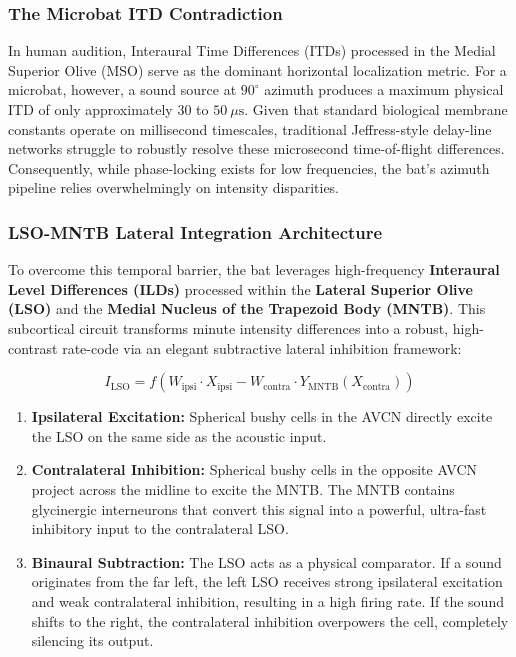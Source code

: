 \subsubsection{The Microbat ITD Contradiction}
In human audition, Interaural Time Differences (ITDs) processed in the Medial Superior Olive (MSO) serve as the dominant horizontal localization metric. For a microbat, however, a sound source at $90^{\circ}$ azimuth produces a maximum physical ITD of only approximately $30$ to $50~\mu\text{s}$. Given that standard biological membrane constants operate on millisecond timescales, traditional Jeffress-style delay-line networks struggle to robustly resolve these microsecond time-of-flight differences. Consequently, while phase-locking exists for low frequencies, the bat's azimuth pipeline relies overwhelmingly on intensity disparities.

\subsubsection{LSO-MNTB Lateral Integration Architecture}
To overcome this temporal barrier, the bat leverages high-frequency \textbf{Interaural Level Differences (ILDs)} processed within the \textbf{Lateral Superior Olive (LSO)} and the \textbf{Medial Nucleus of the Trapezoid Body (MNTB)}. This subcortical circuit transforms minute intensity differences into a robust, high-contrast rate-code via an elegant subtractive lateral inhibition framework:

\begin{equation}
    I_{\text{LSO}} = f\left( W_{\text{ipsi}} \cdot X_{\text{ipsi}} - W_{\text{contra}} \cdot Y_{\text{MNTB}}(X_{\text{contra}}) \right)
\end{equation}

\begin{enumerate}
    \item \textbf{Ipsilateral Excitation:} Spherical bushy cells in the AVCN directly excite the LSO on the same side as the acoustic input.
    \item \textbf{Contralateral Inhibition:} Spherical bushy cells in the opposite AVCN project across the midline to excite the MNTB. The MNTB contains glycinergic interneurons that convert this signal into a powerful, ultra-fast inhibitory input to the contralateral LSO.
    \item \textbf{Binaural Subtraction:} The LSO acts as a physical comparator. If a sound originates from the far left, the left LSO receives strong ipsilateral excitation and weak contralateral inhibition, resulting in a high firing rate. If the sound shifts to the right, the contralateral inhibition overpowers the cell, completely silencing its output.
\end{enumerate}

